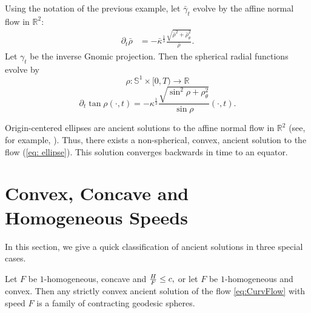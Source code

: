 \documentclass{amsart}
\begin{document}
\begin{example}
Using the notation of the previous example, let $\bar{\gamma}_t$ evolve by the affine normal flow in $\mathbb{R}^2:$
\begin{align*}
\partial_t\bar{\rho}&=-\bar{\kappa}^{\frac{1}{3}}\frac{\sqrt{\bar{\rho}^2+\bar{\rho}_{\theta}^2}}{\bar{\rho}}.
\end{align*}
Let \(\gamma_t\) be the inverse Gnomic projection. Then the spherical radial functions evolve by
\[\rho:\mathbb{S}^1\times[0,T)\to \mathbb{R}\]
\begin{equation}\label{eq: ellipse}
\partial_t\tan\rho(\cdot,t)=-\kappa^{\frac{1}{3}} \frac{\sqrt{\sin^2\rho+\rho_{\theta}^2}}{\sin\rho}(\cdot,t).
\end{equation}

Origin-centered ellipses are ancient solutions to the affine normal flow in $\mathbb{R}^2$ (see, for example, \cite{Ivaki:01/2016}). Thus, there exists a non-spherical, convex, ancient solution to the flow (\ref{eq: ellipse}). This solution converges backwards in time to an equator.
\end{example}

\section{Convex, Concave and Homogeneous Speeds}\label{sec:concave_convex_homogeneous}
In this section, we give a quick classification of ancient solutions in three special cases.

\begin{thm}
Let $F$ be $1$-homogeneous, concave and $\frac{H}{F}\leq c,$ or let $F$ be $1$-homogeneous and convex. Then any strictly convex ancient solution of the flow \eqref{eq:CurvFlow} with speed $F$ is a family of contracting geodesic spheres.
\end{thm}
\end{document}
